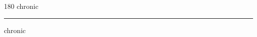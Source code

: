 
\begin{frame}
\begin{center}
\begin{turn}{180}
{\fontsize{2.5cm}{1em}\selectfont chronic}
\end{turn}
\vspace{1em}\par  
\hrule
\vspace{1em}\par  
{\fontsize{2.5cm}{1em}\selectfont chronic}
\end{center}
\end{frame}
